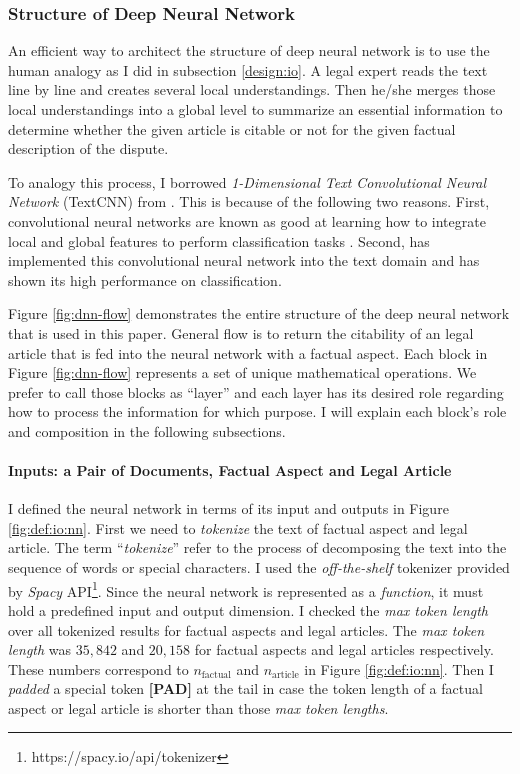 \documentclass[12pt,letterpaper]{article}
\begin{document}
\subsubsection{Structure of Deep Neural Network}

 
An efficient way to architect the structure of deep neural network is to use the
human analogy as I did in subsection \ref{design:io}.
A legal expert reads the text line by line and creates several local understandings.
Then he/she merges those local understandings into a global level to summarize
an essential information to determine whether
the given article is citable or not for the given factual description of the dispute.
 
To analogy this process, I borrowed \textit{1-Dimensional Text Convolutional Neural Network} (TextCNN) from \cite{textcnn}.
This is because of the following two reasons.
First, convolutional neural networks are known as good at learning how to integrate local and global features to perform classification tasks \citep{554195, 8227460}.
Second, \cite{textcnn} has implemented this convolutional neural network into the text domain
and has shown its high performance on classification.
 
Figure \ref{fig:dnn-flow} demonstrates the entire structure of the deep neural network that is used in this paper.
General flow is to return the citability of an legal article that is fed into the neural network with a factual aspect.
Each block in Figure \ref{fig:dnn-flow} represents a set of unique mathematical operations.
We prefer to call those blocks as ``layer''
and each layer has its desired role regarding how to process the information for which purpose.
I will explain each block's role and composition in the following subsections.

\paragraph{Inputs: a Pair of Documents, Factual Aspect and Legal Article}

I defined the neural network in terms of its input and outputs in Figure \ref{fig:def:io:nn}.
First we need to \textit{tokenize} the text of factual aspect and legal article. The term ``\textit{tokenize}''
refer to the process of decomposing the text into the sequence of words or special characters.
I used the \textit{off-the-shelf} tokenizer provided by \textit{Spacy} API\footnote{https://spacy.io/api/tokenizer}.
Since the neural network is represented as a \textit{function}, it must hold a predefined input and output dimension.
I checked the \textit{max token length} over all tokenized results for factual aspects and legal articles.
The \textit{max token length} was $35,842$ and $20,158$ for factual aspects and legal articles respectively. These numbers correspond to $n_{\text{factual}}$ and $n_{\text{article}}$ in Figure \ref{fig:def:io:nn}.
Then I \textit{padded} a special token \textbf{[PAD]} at the tail in case the token length of a factual aspect
or legal article is shorter than those \textit{max token lengths}.
 
\end{document}
